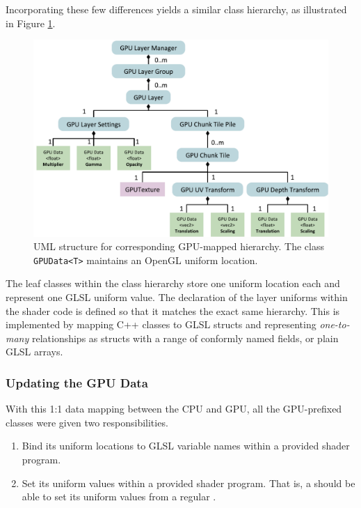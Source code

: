 Incorporating these few differences yields a similar class hierarchy, as illustrated in Figure \ref{fig:gpulayermanager}. 

\begin{figure}[htbp]
    \centering
    \includegraphics[width=\textwidth]{figures/implementation/layers/gpulayermanager.pdf}
    \caption{UML structure for corresponding GPU-mapped hierarchy. The class \texttt{GPUData<T>} maintains an OpenGL uniform location.}
    \label{fig:gpulayermanager}
\end{figure}

The leaf classes within the class hierarchy store one uniform location each and represent one GLSL uniform value. The declaration of the layer uniforms within the shader code is defined so that it matches the exact same hierarchy. This is implemented by mapping C++ classes to GLSL structs and representing \emph{one-to-many} relationships as structs with a range of conformly named fields, or plain GLSL arrays.

\subsubsection{Updating the GPU Data}

With this 1:1 data mapping between the CPU and GPU, all the GPU-prefixed classes were given two responsibilities.

\begin{enumerate}
\item Bind its uniform locations to GLSL variable names within a provided shader program.
\item Set its uniform values within a provided shader program. That is, a  should be able to set its uniform values from a regular .
\end{enumerate}


